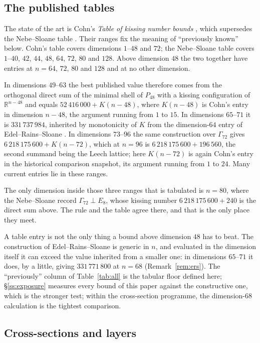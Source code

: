 \documentclass[11pt]{amsart}
\theoremstyle{remark}
\newcommand{\Pff}{P_{48}}
\newcommand{\Gsz}{\Gamma_{72}}
\newcommand{\R}{\mathbb{R}}
\begin{document}
\subsection{The published tables}\label{ss:tables}

The state of the art is Cohn's \emph{Table of kissing number bounds}
\cite{cohn-table,cohn-data}, which supersedes the Nebe--Sloane table
\cite{nebe-sloane}. Their ranges fix the meaning of ``previously known'' below.
Cohn's table covers dimensions $1$--$48$ and $72$; the Nebe--Sloane table covers
$1$--$40$, $42$, $44$, $48$, $64$, $72$, $80$ and $128$. Above dimension $48$ the
two together have entries at $n=64$, $72$, $80$ and $128$ and at no other dimension.

In dimensions $49$--$63$ the best published value therefore comes from the
orthogonal direct sum of the minimal shell of $\Pff$ with a kissing configuration
of $\R^{n-48}$ and equals $52\,416\,000+K(n-48)$, where $K(n-48)$ is Cohn's entry in
dimension $n-48$, the argument running from $1$ to $15$. In dimensions $65$--$71$ it is
$331\,737\,984$, inherited by monotonicity of $K$ from the dimension-$64$ entry
of Edel--Rains--Sloane \cite{edel-rains-sloane1998}. In dimensions $73$--$96$ the
same construction over $\Gsz$ gives $6\,218\,175\,600+K(n-72)$, which at $n=96$ is
$6\,218\,175\,600+196\,560$, the second summand being the Leech lattice; here
$K(n-72)$ is again Cohn's entry in the historical comparison snapshot, its
argument running from $1$ to $24$. Many current entries lie in these ranges.

The only dimension inside those three ranges that is tabulated is $n=80$, where the Nebe--Sloane record
$\Gsz\perp E_8$, whose kissing number $6\,218\,175\,600+240$ is the direct sum
above. The rule and the table agree there, and that is the only place they meet.

A table entry is not the only thing a bound above dimension $48$ has to beat. The
construction of Edel--Rains--Sloane is generic in $n$, and evaluated in the dimension
itself it can exceed the value inherited from a smaller one: in dimensions $65$--$71$
it does, by a little, giving $331\,771\,800$ at $n=68$ (Remark~\ref{rem:ers}). The
``previously'' column of Table~\ref{tab:all} is the tabular floor defined here;
\S\ref{ss:exposure} measures every bound of this paper against the constructive one,
which is the stronger test; within the cross-section programme, the
dimension-$68$ calculation is the tightest comparison.

\subsection{Cross-sections and layers}
\end{document}
